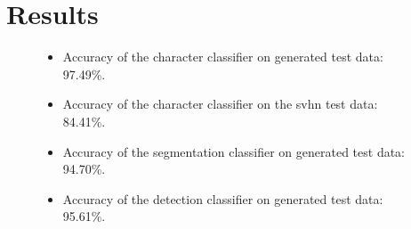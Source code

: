 \documentclass[12pt]{article}
\begin{document}

\section{Results}
\begin{figure}[ht!]
  \begin{itemize}
    \item Accuracy of the character classifier on generated test data: 97.49\%.
    \item Accuracy of the character classifier on the svhn test data: 84.41\%.
    \item Accuracy of the segmentation classifier on generated test data: 94.70\%.
    \item Accuracy of the detection classifier on generated test data: 95.61\%.

  \end{itemize}


\end{figure}
\end{document}
